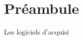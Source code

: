 \documentclass[10pt]{article}
\newif\ifxp
\begin{document}
\ifxp

\else

\fi



 \renewcommand{\baselinestretch}{1.2}
\setlength{\parskip}{2ex plus 0.5ex minus 0.2ex}



\section{Préambule}
Les logiciels d'acquisi
\end{document}
